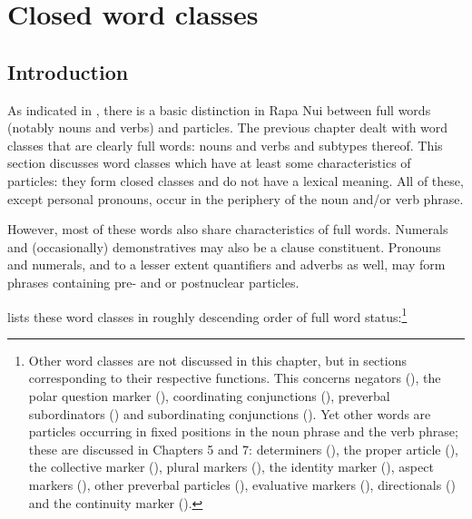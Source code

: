 \chapter[Closed word classes]{Closed word classes}\label{ch:4}
\section{Introduction}\label{sec:4.1}

As indicated in , there is a basic distinction in Rapa Nui between full words (notably nouns and verbs) and particles. The previous chapter dealt with word classes that are clearly full words: nouns and verbs and subtypes thereof. This section discusses word classes which have at least some characteristics of particles: they form closed classes and do not have a lexical meaning. All of these, except personal pronouns, occur in the periphery of the noun and/or verb phrase.

However, most of these words also share characteristics of full words. Numerals and (occasionally) demonstratives may also be a clause constituent. Pronouns and numerals, and to a lesser extent quantifiers and adverbs as well, may form phrases containing pre- and or postnuclear particles. 

 lists these word classes in roughly descending order of full word status:\footnote{\label{fn:159}Other word classes are not discussed in this chapter, but in sections corresponding to their respective functions. This concerns negators (), the polar question marker (), coordinating conjunctions (), preverbal subordinators () and subordinating conjunctions (). Yet other words are particles occurring in fixed positions in the noun phrase and the verb phrase; these are discussed in Chapters 5 and 7: determiners (), the proper article (), the collective marker (), plural markers (), the identity marker (), aspect markers (), other preverbal particles (), evaluative markers (), directionals () and the continuity marker ().}


